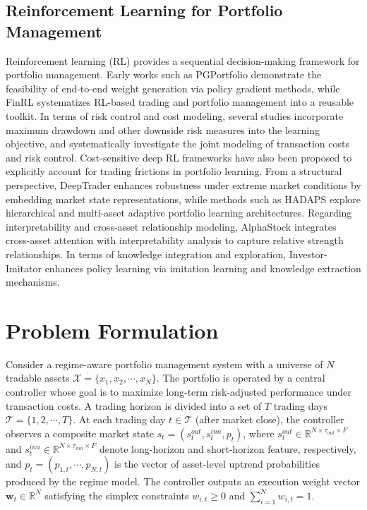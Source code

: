 \documentclass[letterpaper]{article} %
\begin{document}
\subsection{Reinforcement Learning for Portfolio Management}
Reinforcement learning (RL) provides a sequential decision-making framework for portfolio management. Early works such as PGPortfolio demonstrate the feasibility of end-to-end weight generation via policy gradient methods\citep{4}, while FinRL systematizes RL-based trading and portfolio management into a reusable toolkit\citep{5}.
In terms of risk control and cost modeling, several studies incorporate maximum drawdown and other downside risk measures into the learning objective\citep{11}, and systematically investigate the joint modeling of transaction costs and risk control\citep{23}. Cost-sensitive deep RL frameworks have also been proposed to explicitly account for trading frictions in portfolio learning\citep{24}.
From a structural perspective, DeepTrader enhances robustness under extreme market conditions by embedding market state representations\citep{6}, while methods such as HADAPS explore hierarchical and multi-asset adaptive portfolio learning architectures\citep{25}. Regarding interpretability and cross-asset relationship modeling, AlphaStock integrates cross-asset attention with interpretability analysis to capture relative strength relationships\citep{alphastock}. In terms of knowledge integration and exploration, Investor-Imitator enhances policy learning via imitation learning and knowledge extraction mechanisms\citep{8}.

\section{Problem Formulation}
Consider a regime-aware portfolio management system with a universe of $N$ tradable assets $\mathcal{X}=\{x_1,x_2,\cdots,x_N\}$. The portfolio is operated by a central controller whose goal is to maximize long-term risk-adjusted performance under transaction costs. A trading horizon is divided into a set of $T$ trading days $\mathcal{T}=\{1,2,\cdots,T\}$. At each trading day $t\in\mathcal{T}$ (after market close), the controller observes a composite market state $s_t=(s_t^{out}, s_t^{inn}, p_t)$, where $s_t^{out}\in\mathbb{R}^{N\times\tau_{out}\times F}$ and $s_t^{inn}\in\mathbb{R}^{N\times\tau_{inn}\times F}$ denote long-horizon and short-horizon feature, respectively, and $p_t=(p_{1,t},\cdots,p_{N,t})$ is the vector of asset-level uptrend probabilities produced by the regime model. The controller outputs an execution weight vector $\mathbf{w}_t\in\mathbb{R}^N$ satisfying the simplex constraints $w_{i,t}\ge 0$ and $\sum_{i=1}^N w_{i,t}=1$.
\end{document}
